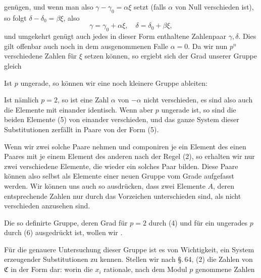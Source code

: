 gen\"ugen, und wenn man also $\gamma - \gamma_0 = \alpha\xi$ setzt (falls $\alpha$ von Null verschieden ist), so folgt $\delta - \delta_0 = \beta\xi$, also
\[ \gamma = \gamma_0 + \alpha\xi, \quad \delta = \delta_0 + \beta\xi, \]
und umgekehrt gen\"ugt auch jedes in dieser Form enthaltene Zahlenpaar $\gamma, \delta$. Dies gilt offenbar auch noch in dem ausgenommenen Falle $\alpha = 0$. Da wir nun $p^n$ verschiedene Zahlen f\"ur $\xi$ setzen k\"onnen, so ergiebt sich der Grad unserer Gruppe gleich

Ist $p$ ungerade, so k\"onnen wir eine noch kleinere Gruppe ableiten:

Ist n\"amlich $p = 2$, so ist eine Zahl $\alpha$ von $-\alpha$ nicht verschieden, es sind also auch die Elemente
mit einander identisch. Wenn aber $p$ ungerade ist, so sind die beiden Elemente (5) von einander verschieden, und das ganze System dieser Substitutionen zerf\"allt in Paare von der Form (5).

Wenn wir zwei solche Paare nehmen und componiren je ein Element des einen Paares mit je einem Element des anderen nach der Regel (2), so erhalten wir nur zwei verschiedene Elemente, die wieder ein solches Paar bilden. Diese Paare k\"onnen also selbst als Elemente einer neuen Gruppe vom Grade
aufgefasst werden. Wir k\"onnen uns auch so ausdr\"ucken, dass zwei Elemente $A$, deren entsprechende Zahlen nur durch das Vorzeichen unterschieden sind, als nicht verschieden anzusehen sind.

Die so definirte Gruppe, deren Grad f\"ur $p = 2$ durch (4) und f\"ur ein ungerades $p$ durch (6) ausgedr\"uckt ist, wollen wir .

F\"ur die genauere Untersuchung dieser Gruppe ist es von Wichtigkeit, ein System erzeugender Substitutionen zu kennen. Stellen wir nach \S.\,64, (2) die Zahlen von $\mathfrak{C}$ in der Form dar:
worin die $x_i$ rationale, nach dem Modul $p$ genommene Zahlen
